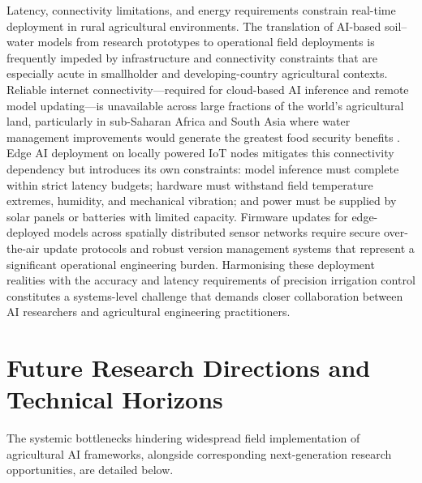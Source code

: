 \documentclass[land,article,submit,pdftex,moreauthors]{Definitions/mdpi}
\numberwithin{equation}{section}
\begin{document}
Latency, connectivity limitations, and energy requirements constrain real-time deployment in rural agricultural environments. The translation of AI-based soil--water models from research prototypes to operational field deployments is frequently impeded by infrastructure and connectivity constraints that are especially acute in smallholder and developing-country agricultural contexts. Reliable internet connectivity---required for cloud-based AI inference and remote model updating---is unavailable across large fractions of the world's agricultural land, particularly in sub-Saharan Africa and South Asia where water management improvements would generate the greatest food security benefits \citep{shepherd2022ethics}. Edge AI deployment on locally powered IoT nodes mitigates this connectivity dependency but introduces its own constraints: model inference must complete within strict latency budgets; hardware must withstand field temperature extremes, humidity, and mechanical vibration; and power must be supplied by solar panels or batteries with limited capacity. Firmware updates for edge-deployed models across spatially distributed sensor networks require secure over-the-air update protocols and robust version management systems that represent a significant operational engineering burden. Harmonising these deployment realities with the accuracy and latency requirements of precision irrigation control constitutes a systems-level challenge that demands closer collaboration between AI researchers and agricultural engineering practitioners.

\section{Future Research Directions and Technical Horizons}

The systemic bottlenecks hindering widespread field implementation of agricultural AI frameworks, alongside corresponding next-generation research opportunities, are detailed below.

\footnotesize
\setlength{\LTleft}{0pt}
\setlength{\LTright}{0pt}
\end{document}
